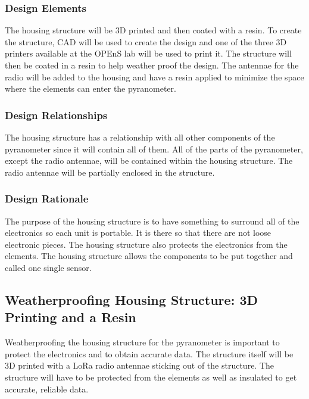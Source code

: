 \documentclass[10pt,draftclsnofoot,onecolumn,letterpaper]{article}
\begin{document}
\subsubsection{Design Elements}
The housing structure will be 3D printed and then coated with a resin. To create the structure, CAD will be used to create the design and one of the three 3D printers available at the OPEnS lab will be used to print it. The structure will then be coated in a resin to help weather proof the design. The antennae for the radio will be added to the housing and have a resin applied to minimize the space where the elements can enter the pyranometer. 

\subsubsection{Design Relationships}
The housing structure has a relationship with all other components of the pyranometer since it will contain all of them. All of the parts of the pyranometer, except the radio antennae, will be contained within the housing structure. The radio antennae will be partially enclosed in the structure.

\subsubsection{Design Rationale}
The purpose of the housing structure is to have something to surround all of the electronics so each unit is portable. It is there so that there are not loose electronic pieces. The housing structure also protects the electronics from the elements. The housing structure allows the components to be put together and called one single sensor. 

\subsection{Weatherproofing Housing Structure: 3D Printing and a Resin}
Weatherproofing the housing structure for the pyranometer is important to protect the electronics and to obtain accurate data. The structure itself will be 3D printed with a LoRa radio antennae sticking out of the structure. The structure will have to be protected from the elements as well as insulated to get accurate, reliable data. 
\end{document}
